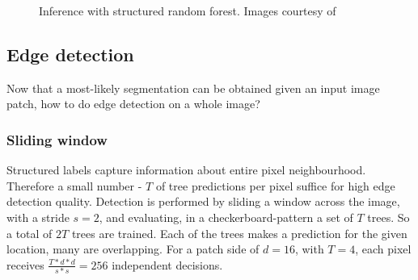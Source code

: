 \begin{figure}[ht!]
\centering
\caption{Inference with structured random forest. Images courtesy of~\cite{DollarBlog2013srf}}
\label{fig:srf-inference}
\end{figure}

\subsection{Edge detection}
\label{subsection:edge-detection}
Now that a most-likely segmentation can be obtained given an input image patch, how to do edge detection on a whole image?

\subsubsection*{Sliding window}
Structured labels capture information about entire pixel neighbourhood. Therefore a small number - $T$ of tree predictions per pixel suffice for high edge detection quality. Detection is performed by sliding a window across the image, with a stride $s = 2$, and evaluating, in a checkerboard-pattern a set of $T$ trees. So a total of $2T$ trees are trained. Each of the trees makes a prediction for the given location, many are overlapping. For a patch side of $d = 16$, with $T=4$, each pixel receives $\frac{T*d*d}{s*s}=256$ independent decisions.

